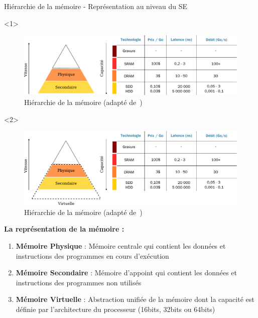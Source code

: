 \documentclass[8pt]{beamer}
\begin{document}
\begin{frame}{Hiérarchie de la mémoire - Représentation au niveau du SE}
    \begin{onlyenv}<1>
        \begin{figure}
            \centering

            \includegraphics[width=\linewidth]{figures/hierarchy_memory_virtual.pdf}
            \caption{Hiérarchie de la mémoire (adapté
                de~\cite{harris2021digital})}
        \end{figure}
    \end{onlyenv}
    \begin{onlyenv}<2>
        \begin{figure}
            \centering

            \includegraphics[width=\linewidth]{figures/hierarchy_memory_virtual_physic.pdf}
            \caption{Hiérarchie de la mémoire (adapté
                de~\cite{harris2021digital})}
        \end{figure}
    \end{onlyenv}

    \textbf{La représentation de la mémoire :}
    \begin{enumerate}
        \item \textbf{Mémoire Physique} : Mémoire centrale qui contient
              les
              données et instructions des programmes en cours d'exécution
        \item \textbf{Mémoire Secondaire} : Mémoire d'appoint qui
              contient
              les données et instructions des programmes non utilisés
        \item<2> \textbf{Mémoire Virtuelle} : Abstraction unifiée de la
            mémoire dont la capacité est définie par l'architecture du
            processeur (16bits, 32bits ou 64bits)

    \end{enumerate}
\end{frame}
\end{document}
